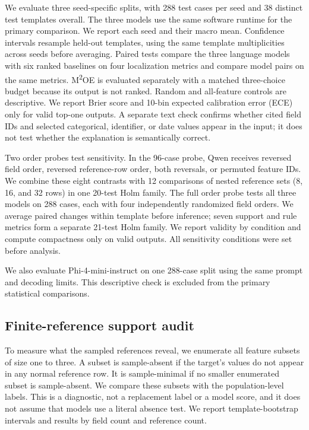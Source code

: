 \documentclass[conference]{IEEEtran}
\begin{document}
We evaluate three seed-specific splits, with 288 test cases per seed and 38 distinct test templates overall. The three models use the same software runtime for the primary comparison. We report each seed and their macro mean. Confidence intervals resample held-out templates, using the same template multiplicities across seeds before averaging. Paired tests compare the three language models with six ranked baselines on four localization metrics and compare model pairs on the same metrics. M\textsuperscript{2}OE is evaluated separately with a matched three-choice budget because its output is not ranked. Random and all-feature controls are descriptive. We report Brier score and 10-bin expected calibration error (ECE) only for valid top-one outputs. A separate text check confirms whether cited field IDs and selected categorical, identifier, or date values appear in the input; it does not test whether the explanation is semantically correct.

Two order probes test sensitivity. In the 96-case probe, Qwen receives reversed field order, reversed reference-row order, both reversals, or permuted feature IDs. We combine these eight contrasts with 12 comparisons of nested reference sets (8, 16, and 32 rows) in one 20-test Holm family. The full order probe tests all three models on 288 cases, each with four independently randomized field orders. We average paired changes within template before inference; seven support and rule metrics form a separate 21-test Holm family. We report validity by condition and compute compactness only on valid outputs. All sensitivity conditions were set before analysis.

We also evaluate Phi-4-mini-instruct on one 288-case split using the same prompt and decoding limits. This descriptive check is excluded from the primary statistical comparisons.

\subsection{Finite-reference support audit}
To measure what the sampled references reveal, we enumerate all feature subsets of size one to three. A subset is sample-absent if the target's values do not appear in any normal reference row. It is sample-minimal if no smaller enumerated subset is sample-absent. We compare these subsets with the population-level labels. This is a diagnostic, not a replacement label or a model score, and it does not assume that models use a literal absence test. We report template-bootstrap intervals and results by field count and reference count.
\end{document}
